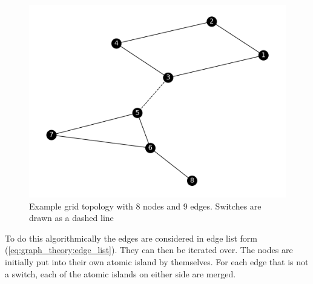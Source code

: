 \begin{figure}[H]
    \begin{center}
        \includegraphics[width=.6\linewidth]{img/atomic_island.png}
    \end{center}
    \caption{
        Example grid topology with 8 nodes and 9 edges. Switches
        are drawn as a dashed line
    }
    \label{fig:data_prep:atomic_islands}
\end{figure}

To do this algorithmically the edges are considered in edge list
form (\ref{eq:graph_theory:edge_list}). They can then be iterated over.
The nodes are initially put into their own atomic island by themselves.
For each edge that is not a switch, each of the atomic islands on either
side are merged.

